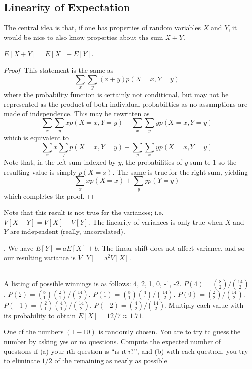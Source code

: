 \documentclass[11pt]{article}
\theoremstyle{definition}
\begin{document}
\subsection{Linearity of Expectation}
The central idea is that, if one has properties of random variables $X$ and $Y$, it would be nice to also know properties about the sum $X + Y$. 

 $E[X + Y] = E[X] + E[Y]$.
\begin{proof}
This statement is the same as $$\sum_x \sum_y (x + y)p(X = x, Y = y)$$where the probability function is certainly not conditional, but may not be represented as the product of both individual probabilities as no assumptions are made of independence. This may be rewritten as $$\sum_x \sum_y x p(X = x, Y = y) + \sum_x \sum_y y p(X = x, Y = y)$$which is equivalent to $$\sum_x x \sum_y p(X =x, Y = y) + \sum_y \sum_x y p(X =x, Y = y)$$Note that, in the left sum indexed by $y$, the probabilities of $y$ sum to 1 so the resulting value is simply $p(X = x)$. The same is true for the right sum, yielding $$\sum_x xp(X =x) + \sum_y y p(Y = y)$$which completes the proof. 
\end{proof}
\noindent Note that this result is not true for the variances; i.e.  $V[X+Y] = V[X] + V[Y]$. The linearity of variances is only true when $X$ and $Y$ are independent (really, uncorrelated). 

. We have $E[Y] = aE[X] + b$. The linear shift does not affect variance, and so our resulting variance is $V[Y] = a^2V[X]$. 

 \\

\noindent A listing of possible winnings is as follows: 4, 2, 1, 0, -1, -2. $P(4) = \binom{8}{2}/\binom{14}{2}$. $P(2) = \binom{8}{1} \binom{2}{1} / \binom{14}{2}$. $P(1) = \binom{8}{1} \binom{4}{1} / \binom{14}{2}$. $P(0) = \binom{2}{2} / \binom{14}{2}$. $P(-1) = \binom{2}{1} \binom{4}{1} / \binom{14}{2}$. $P(-2) = \binom{4}{2} / \binom{14}{2}$. Multiply each value with its probability to obtain $E[X] = 12/7 \approx 1.71$.

\example One of the numbers $(1-10)$ is randomly chosen. You are to try to guess the number by asking yes or no questions. Compute the expected number of questions if (a) your ith question is ``is it $i$?'', and (b) with each question, you try to eliminate $1/2$ of the remaining as nearly as possible. \\
\end{document}
